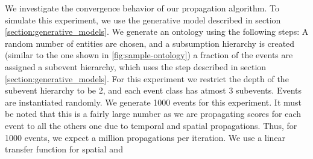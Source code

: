 We investigate the convergence behavior of our propagation algorithm. To simulate this experiment, we use the generative model described in section \ref{section:generative_models}. We generate an ontology using the following steps: A random number of entities are chosen, and a subsumption hierarchy is created (similar to the one shown in \ref{fig:sample-ontology}) a fraction of the events are assigned a subevent hierarchy, which uses the step described in section \ref{section:generative_models}. For this experiment we restrict the depth of the subevent hierarchy to be 2, and each event class has atmost 3 subevents. Events are instantiated randomly. We generate 1000 events for this experiment. It must be noted that this is a fairly large number as we are propagating scores for each event to all the others one due to temporal and spatial propagations. Thus, for 1000 events, we expect a million propagations per iteration. We use a linear transfer function for spatial and 

